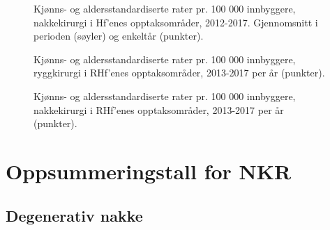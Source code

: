 \begin{figure}[ht]
\caption{Kjønns- og aldersstandardiserte rater pr. 100 000 innbyggere, nakkekirurgi i Hf’enes opptaksområder, 2012-2017. Gjennomsnitt i perioden (søyler) og enkeltår (punkter).}
\label{fig:AA_Nakkekirurgi_BoHF1}
\end{figure}

\begin{figure}[ht]
\caption{Kjønns- og aldersstandardiserte rater pr. 100 000 innbyggere, ryggkirurgi i RHf’enes opptaksområder, 2013-2017 per år (punkter).}
\label{fig:Rygkirurgi_line1}
\end{figure}

\begin{figure}[ht]
\caption{Kjønns- og aldersstandardiserte rater pr. 100 000 innbyggere, nakkekirurgi i RHf’enes opptaksområder, 2013-2017 per år (punkter).}
\label{fig:Nakkekirurgi_line1}
\end{figure}




\clearpage



\section{Oppsummeringstall for NKR}




\subsection{Degenerativ nakke}

